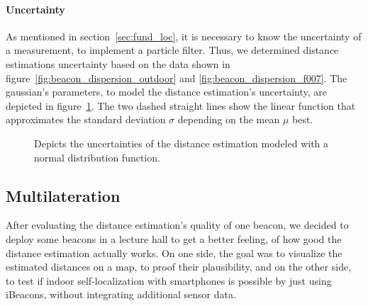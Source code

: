 \paragraph{Uncertainty} As mentioned in section~\ref{sec:fund_loc}, it is necessary to know the uncertainty of a measurement, to implement a particle filter. Thus, we determined distance estimations uncertainty based on the data shown in figure~\ref{fig:beacon_dispersion_outdoor} and \ref{fig:beacon_dispersion_f007}. The gaussian's parameters, to model the distance estimation's uncertainty, are depicted in figure~\ref{fig:beacon_eval_ndf}. The two dashed straight lines show the linear function that approximates the standard deviation $\sigma$ depending on the mean $\mu$ best.

\begin{figure}
\caption{Depicts the uncertainties of the distance estimation modeled with a normal distribution function.}
\label{fig:beacon_eval_ndf}
\end{figure}




\subsection{Multilateration}
After evaluating the distance estimation's quality of one beacon, we decided to deploy some beacons in a lecture hall to get a better feeling, of how good the distance estimation actually works. On one side, the goal was to visualize the estimated distances on a map, to proof their plausibility, and on the other side, to test if indoor self-localization with smartphones is possible by just using iBeacons, without integrating additional sensor data.

